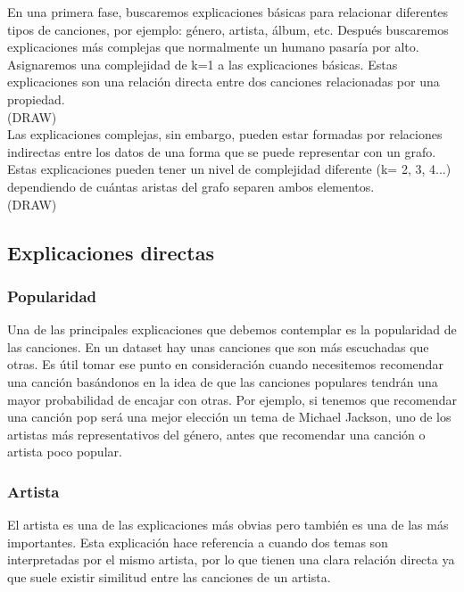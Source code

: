 En una primera fase, buscaremos explicaciones básicas para relacionar diferentes tipos de canciones, por ejemplo: género, artista, álbum, etc. Después buscaremos explicaciones más complejas que normalmente un humano pasaría por alto. Asignaremos una complejidad de k=1 a las explicaciones básicas. Estas explicaciones son una relación directa entre dos canciones relacionadas por una propiedad.\\

(DRAW)\\

Las explicaciones complejas, sin embargo, pueden estar formadas por relaciones indirectas entre los datos de una forma que se puede representar con un grafo. Estas explicaciones pueden tener un nivel de complejidad diferente (k= 2, 3, 4...) dependiendo de cuántas aristas del grafo separen ambos elementos.\\

(DRAW)\\


\subsection{Explicaciones directas}

\subsubsection*{Popularidad}

Una de las principales explicaciones que debemos contemplar es la popularidad de las canciones. En un dataset hay unas canciones que son más escuchadas que otras. Es útil tomar ese punto en consideración cuando necesitemos recomendar una canción basándonos en la idea de que las canciones populares tendrán una mayor probabilidad de encajar con otras. Por ejemplo, si tenemos que recomendar una canción pop será una mejor elección un tema de Michael Jackson, uno de los artistas más representativos del género, antes que recomendar una canción o artista poco popular.

\subsubsection*{Artista}

El artista es una de las explicaciones más obvias pero también es una de las más importantes. Esta explicación hace referencia a cuando dos temas son interpretadas por el mismo artista, por lo que tienen una clara relación directa ya que suele existir similitud entre las canciones de un artista.

